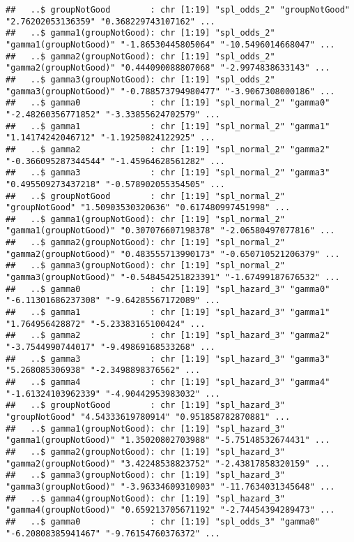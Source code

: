 \documentclass[
]{article}
\begin{document}
\begin{verbatim}
##   ..$ groupNotGood        : chr [1:19] "spl_odds_2" "groupNotGood" "2.76202053136359" "0.368229743107162" ...
##   ..$ gamma1(groupNotGood): chr [1:19] "spl_odds_2" "gamma1(groupNotGood)" "-1.86530445805064" "-10.5496014668047" ...
##   ..$ gamma2(groupNotGood): chr [1:19] "spl_odds_2" "gamma2(groupNotGood)" "0.444090088807068" "-2.9974838633143" ...
##   ..$ gamma3(groupNotGood): chr [1:19] "spl_odds_2" "gamma3(groupNotGood)" "-0.788573794980477" "-3.9067308000186" ...
##   ..$ gamma0              : chr [1:19] "spl_normal_2" "gamma0" "-2.48260356771852" "-3.33855624702579" ...
##   ..$ gamma1              : chr [1:19] "spl_normal_2" "gamma1" "1.14174242046712" "-1.19250824122925" ...
##   ..$ gamma2              : chr [1:19] "spl_normal_2" "gamma2" "-0.366095287344544" "-1.45964628561282" ...
##   ..$ gamma3              : chr [1:19] "spl_normal_2" "gamma3" "0.495509273437218" "-0.578902055354505" ...
##   ..$ groupNotGood        : chr [1:19] "spl_normal_2" "groupNotGood" "1.50903530320636" "0.617480997451998" ...
##   ..$ gamma1(groupNotGood): chr [1:19] "spl_normal_2" "gamma1(groupNotGood)" "0.307076607198378" "-2.06580497077816" ...
##   ..$ gamma2(groupNotGood): chr [1:19] "spl_normal_2" "gamma2(groupNotGood)" "0.483555713990173" "-0.650710521206379" ...
##   ..$ gamma3(groupNotGood): chr [1:19] "spl_normal_2" "gamma3(groupNotGood)" "-0.548454251823391" "-1.67499187676532" ...
##   ..$ gamma0              : chr [1:19] "spl_hazard_3" "gamma0" "-6.11301686237308" "-9.64285567172089" ...
##   ..$ gamma1              : chr [1:19] "spl_hazard_3" "gamma1" "1.764956428872" "-5.23383165100424" ...
##   ..$ gamma2              : chr [1:19] "spl_hazard_3" "gamma2" "-3.7544990744017" "-9.49869168533268" ...
##   ..$ gamma3              : chr [1:19] "spl_hazard_3" "gamma3" "5.268085306938" "-2.3498898376562" ...
##   ..$ gamma4              : chr [1:19] "spl_hazard_3" "gamma4" "-1.61324103962339" "-4.90442953983032" ...
##   ..$ groupNotGood        : chr [1:19] "spl_hazard_3" "groupNotGood" "4.54333619780914" "0.951858782870881" ...
##   ..$ gamma1(groupNotGood): chr [1:19] "spl_hazard_3" "gamma1(groupNotGood)" "1.35020802703988" "-5.75148532674431" ...
##   ..$ gamma2(groupNotGood): chr [1:19] "spl_hazard_3" "gamma2(groupNotGood)" "3.42248538823752" "-2.43817858320159" ...
##   ..$ gamma3(groupNotGood): chr [1:19] "spl_hazard_3" "gamma3(groupNotGood)" "-3.96334609310903" "-11.7634031345648" ...
##   ..$ gamma4(groupNotGood): chr [1:19] "spl_hazard_3" "gamma4(groupNotGood)" "0.659213705671192" "-2.74454394289473" ...
##   ..$ gamma0              : chr [1:19] "spl_odds_3" "gamma0" "-6.20808385941467" "-9.76154760376372" ...

\end{verbatim}
\end{document}
